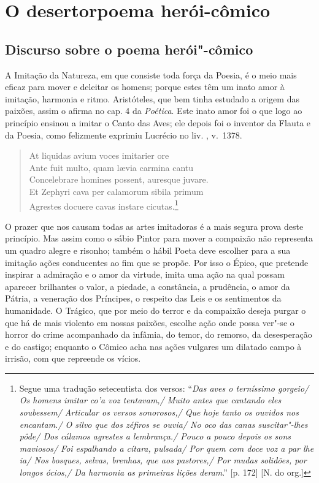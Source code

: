 \part[O desertor: poema herói-cômico]{O desertor\break poema herói-cômico} 

\chapter{Discurso sobre o poema herói"-cômico}

A Imitação da Natureza, em que consiste toda força da Poesia, 				\index{\Iminat}
é o meio mais eficaz para mover e deleitar os homens; 					\index{\Util}
porque estes têm um inato amor à imitação, harmonia e ritmo.
Aristóteles, que bem tinha estudado a origem das paixões, assim o afirma no 
cap. 4 da \textit{Poética}. 							\index{\Arist}
Este inato amor foi o que logo ao princípio ensinou a imitar o Canto das Aves; ele 
depois foi o inventor da Flauta e da Poesia, como felizmente exprimiu Lucrécio
no liv. , v.~1378.								\index{\Lucre} \index{\Poet}


\begin{verse}
At liquidas avium voces imitarier ore \\
Ante fuit multo, quam l\ae via carmina cantu \\
Concelebrare homines possent, auresque \qb{}juvare. \\
Et Zephyri cava per calamorum sibila \qb{}primum \\
Agrestes docuere cavas instare cicutas.\footnote{ Segue uma tradução
setecentista dos versos: ``\textit{Das aves o terníssimo gorgeio/ Os homens
imitar co'a voz tentavam,/ Muito antes que cantando eles soubessem/ Articular
os versos sonorosos,/ Que hoje tanto os ouvidos nos encantam./ O silvo que dos
zéfiros se ouvia/ No oco das canas suscitar"-lhes pôde/ Dos cálamos agrestes a 
lembrança./ Pouco a pouco depois os sons maviosos/ Foi espalhando a cítara,
pulsada/ Por quem com doce voz a par lhe ia/ Nos bosques, selvas, brenhas, que
aos pastores,/ Por mudas solidões, por longos ócios,/ Da harmonia as primeiras
lições deram}.'' [p. 172] [N. do org.] }\\[10pt] 				\index{\Zefir}
\end{verse}

O prazer que nos causam todas as artes imitadoras
é a mais segura prova deste princípio. Mas assim 
como o sábio Pintor para mover a compaixão não 						%
representa um quadro alegre e risonho; também o hábil 
Poeta deve escolher para a sua imitação ações 
conducentes ao fim que se propõe. Por isso o Épico, 					\index{\Epico}
que pretende inspirar a admiração e o amor da virtude, 
imita uma ação na qual possam aparecer brilhantes o valor,
a piedade, a constância, a prudência, o amor da Pátria, 
a veneração dos Príncipes, o respeito das Leis e os 
sentimentos da humanidade. O Trágico, que por meio do terror 				\index{\Trag}
e da compaixão deseja purgar o que há de mais violento em  
nossas paixões, escolhe ação onde possa ver"-se o horror 
do crime acompanhado da infâmia, do temor, do remorso, da desesperação 
e do castigo; enquanto o Cômico acha nas ações vulgares 				\index{\Comic}
um dilatado campo à irrisão, com que repreende os vícios.

